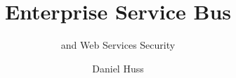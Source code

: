 \documentclass[envcountsame,envcountchap]{svmono}
\begin{document}
\author{Daniel Huss}
\title{Enterprise Service Bus}
\subtitle{and Web Services Security}
\maketitle

\frontmatter%

\tableofcontents

\mainmatter%



%
%

\backmatter%
%

\printindex

\end{document}

